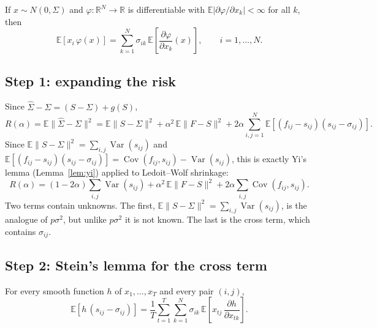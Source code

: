 \begin{lemma}
If $x \sim N(0, \Sigma)$ and $\varphi : \mathbb{R}^N \to \mathbb{R}$ is differentiable with $\mathbb{E}|\partial\varphi/\partial x_k| < \infty$ for all $k$, then
\[
  \mathbb{E}\left[ x_i\, \varphi(x) \right] = \sum_{k=1}^N \sigma_{ik}\, \mathbb{E}\left[ \frac{\partial \varphi}{\partial x_k}(x) \right], \qquad i = 1, \dots, N.
\]
\end{lemma}

\subsection{Step 1: expanding the risk}

Since $\hat\Sigma - \Sigma = (S - \Sigma) + g(S)$,
\[
  R(\alpha) = \mathbb{E}\|\hat\Sigma - \Sigma\|^2
  = \mathbb{E}\|S - \Sigma\|^2 + \alpha^2\, \mathbb{E}\|F - S\|^2 + 2\alpha \sum_{i,j=1}^N \mathbb{E}\left[ (f_{ij} - s_{ij})(s_{ij} - \sigma_{ij}) \right].
\]
Since $\mathbb{E}\|S - \Sigma\|^2 = \sum_{i,j}\operatorname{Var}(s_{ij})$ and $\mathbb{E}[(f_{ij} - s_{ij})(s_{ij} - \sigma_{ij})] = \operatorname{Cov}(f_{ij}, s_{ij}) - \operatorname{Var}(s_{ij})$, this is exactly Yi's lemma (Lemma~\ref{lem:yi}) applied to Ledoit--Wolf shrinkage:
\[
  R(\alpha) = (1 - 2\alpha)\sum_{i,j}\operatorname{Var}(s_{ij}) + \alpha^2\,\mathbb{E}\|F - S\|^2 + 2\alpha\sum_{i,j}\operatorname{Cov}(f_{ij}, s_{ij}).
\]
Two terms contain unknowns. The first, $\mathbb{E}\|S - \Sigma\|^2 = \sum_{i,j}\operatorname{Var}(s_{ij})$, is the analogue of $p\sigma^2$, but unlike $p\sigma^2$ it is not known. The last is the cross term, which contains $\sigma_{ij}$.

\subsection{Step 2: Stein's lemma for the cross term}

\begin{lemma}\label{lem:stein-cov}
For every smooth function $h$ of $x_1, \dots, x_T$ and every pair $(i,j)$,
\[
  \mathbb{E}\left[ h\,(s_{ij} - \sigma_{ij}) \right] = \frac{1}{T} \sum_{t=1}^T \sum_{k=1}^N \sigma_{ik}\, \mathbb{E}\left[ x_{tj}\, \frac{\partial h}{\partial x_{tk}} \right].
\]
\end{lemma}

